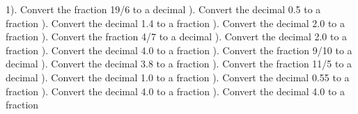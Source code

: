 \documentclass{article}%
\begin{document}
1). Convert the fraction 19/6 to a decimal%
\newline%
\newline%
). Convert the decimal 0.5 to a fraction%
\newline%
\newline%
). Convert the decimal 1.4 to a fraction%
\newline%
\newline%
). Convert the decimal 2.0 to a fraction%
\newline%
\newline%
). Convert the fraction 4/7 to a decimal%
\newline%
\newline%
). Convert the decimal 2.0 to a fraction%
\newline%
\newline%
). Convert the decimal 4.0 to a fraction%
\newline%
\newline%
). Convert the fraction 9/10 to a decimal%
\newline%
\newline%
). Convert the decimal 3.8 to a fraction%
\newline%
\newline%
). Convert the fraction 11/5 to a decimal%
\newline%
\newline%
). Convert the decimal 1.0 to a fraction%
\newline%
\newline%
). Convert the decimal 0.55 to a fraction%
\newline%
\newline%
). Convert the decimal 4.0 to a fraction%
\newline%
\newline%
). Convert the decimal 4.0 to a fraction%
\newline%
\end{document}
